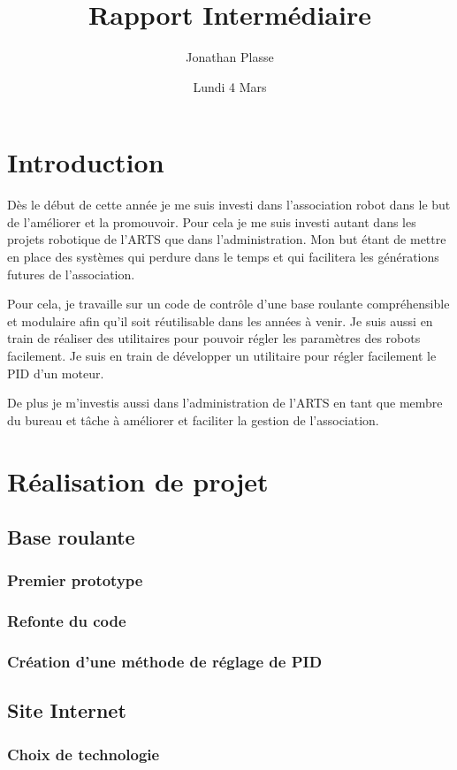\documentclass[12pt,a4paper]{report}
\title{Rapport Intermédiaire}
\author{Jonathan Plasse}
\date{Lundi 4 Mars}
\begin{document}
\maketitle

\chapter*{Introduction}
  Dès le début de cette année je me suis investi dans l'association robot dans le but de l'améliorer et la promouvoir.
  Pour cela je me suis investi autant dans les projets robotique de l'ARTS que dans l'administration.
  Mon but étant de mettre en place des systèmes qui perdure dans le temps et qui facilitera les générations futures de l'association.

  Pour cela, je travaille sur un code de contr\^ole d'une base roulante compréhensible et modulaire afin qu'il soit réutilisable dans les années à venir.
  Je suis aussi en train de réaliser des utilitaires pour pouvoir régler les paramètres des robots facilement. Je suis en train de développer un utilitaire pour régler facilement le PID d'un moteur.

  De plus je m'investis aussi dans l'administration de l'ARTS en tant que membre du bureau et t\^ache à améliorer et faciliter la gestion de l'association.

\chapter{Réalisation de projet}
  \section{Base roulante}
    \subsection{Premier prototype}
    \subsection{Refonte du code}
    \subsection{Création d'une méthode de réglage de PID}
  \section{Site Internet}
    \subsection{Choix de technologie}
\end{document}
